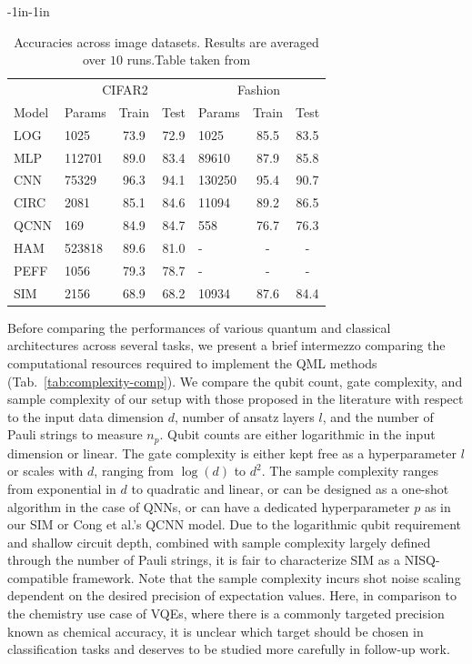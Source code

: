 \documentclass[../main.tex]{subfiles}
\begin{document}
\begin{table}
\setlength{\tabcolsep}{4pt}
\begin{adjustwidth}{-1in}{-1in}  
\centering
\begin{tabular}{llcc|lcc}
\toprule
& \multicolumn{3}{c}{CIFAR2} & \multicolumn{3}{c}{Fashion} \\
Model & Params & Train & Test & Params & Train & Test \\
\midrule
LOG & 1025 & 73.9 & 72.9 & 1025 & 85.5 & 83.5 \\
MLP & 112701 & 89.0 & 83.4 & 89610 & 87.9 & 85.8 \\
CNN & 75329 & 96.3 & 94.1 & 130250 & 95.4 & 90.7 \\
CIRC & 2081 & 85.1 & 84.6 & 11094 & 89.2 & 86.5 \\
QCNN & 169 & 84.9 & 84.7 & 558 & 76.7 & 76.3 \\
\hline
HAM & 523818 & 89.6 & 81.0 & - & - & - \\
PEFF & 1056 & 79.3 & 78.7 & - & - & -  \\
SIM & 2156 & 68.9 & 68.2 & 10934 & 87.6 & 84.4 \\
\bottomrule
\end{tabular}
\end{adjustwidth}
\caption{Accuracies across image datasets. Results are averaged over $10$ runs.Table taken from \cite{tiblias2025an}}
\label{tab:res-img}
\end{table}
Before comparing the performances of various quantum and classical architectures across several tasks, we present a brief intermezzo comparing the computational resources required to implement the QML methods (Tab.~\ref{tab:complexity-comp}). We compare the qubit count, gate complexity, and sample complexity of our setup with those proposed in the literature with respect to the input data dimension $d$, number of ansatz layers $l$, and the number of Pauli strings to measure $n_p$. Qubit counts are either logarithmic in the input dimension or linear. The gate complexity is either kept free as a hyperparameter $l$ or scales with $d$, ranging from $\log(d)$ to $d^2$. The sample complexity ranges from exponential in $d$ to quadratic and linear, or can be designed as a one-shot algorithm in the case of QNNs, or can have a dedicated hyperparameter $p$ as in our SIM or Cong et al.'s QCNN \cite{Cong2019qcnn} model. Due to the logarithmic qubit requirement and shallow circuit depth, combined with sample complexity largely defined through the number of Pauli strings, it is fair to characterize SIM as a NISQ-compatible framework. Note that the sample complexity incurs shot noise scaling dependent on the desired precision of expectation values. Here, in comparison to the chemistry use case of VQEs, where there is a commonly targeted precision known as chemical accuracy, it is unclear which target should be chosen in classification tasks and deserves to be studied more carefully in follow-up work.
\end{document}
